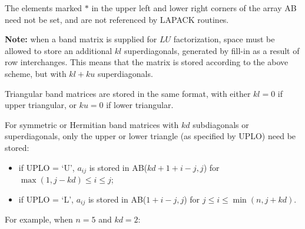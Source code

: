 The elements marked $\ast$ in the upper left and lower right
corners of the array AB need not be set, and are not referenced by
LAPACK routines.

{\bf Note:} when a band matrix is supplied for $LU$ factorization,
space must be allowed to store an 
additional $kl$ superdiagonals,
generated by fill-in as a result of row interchanges.
This means that the matrix is stored according to the above scheme,
but with $kl + ku$ superdiagonals.

Triangular band matrices are stored in the same format, with either
$kl = 0$ if upper triangular, or $ku = 0$ if
lower triangular.

For symmetric or Hermitian band matrices with $kd$ subdiagonals or 
superdiagonals, only the upper or lower triangle (as specified by
UPLO) need be stored:

\begin {itemize}

\item if UPLO = `U', $a_{ij}$ is stored in AB($kd+1+i-j,j$) for 
$\max(1,j-kd) \leq i \leq j$;

\item if UPLO = `L', $a_{ij}$ is stored in AB($1+i-j,j$) for 
$j \leq i \leq \min(n,j+kd)$.

\end{itemize}

For example, when $n = 5$ and $kd = 2$:

